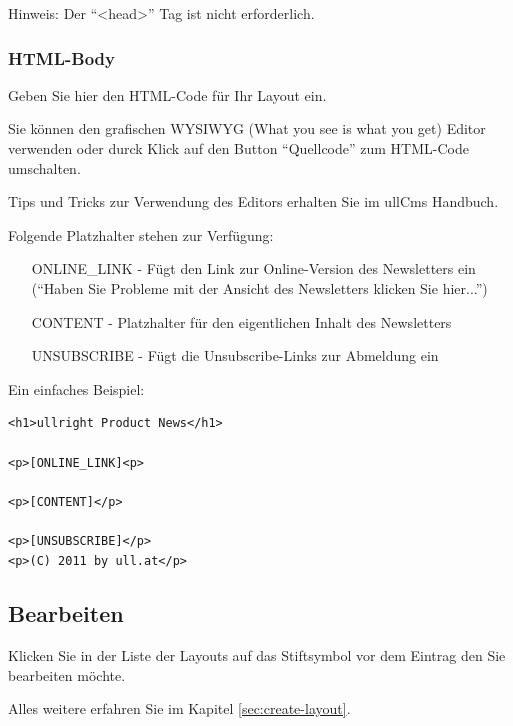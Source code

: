 \documentclass[article, a4paper, oneside, 11pt]{memoir}
\begin{document}
Hinweis: Der "`<head>"' Tag ist nicht erforderlich.

\subsubsection{HTML-Body}

Geben Sie hier den HTML-Code für Ihr Layout ein.

Sie können den grafischen WYSIWYG (What you see is what you get) Editor verwenden oder durck Klick auf den Button "`Quellcode"' zum HTML-Code umschalten.

Tips und Tricks zur Verwendung des Editors erhalten Sie im ullCms Handbuch.


Folgende Platzhalter stehen zur Verfügung:

\begin{itemize}
\item [ONLINE_LINK] - Fügt den Link zur Online-Version des Newsletters ein ("`Haben Sie Probleme mit der Ansicht des Newsletters klicken Sie hier..."')
\item [CONTENT] - Platzhalter für den eigentlichen Inhalt des Newsletters
\item [UNSUBSCRIBE] - Fügt die Unsubscribe-Links zur Abmeldung ein
\end{itemize}

Ein einfaches Beispiel:

\begin{lstlisting}
<h1>ullright Product News</h1>

<p>[ONLINE_LINK]<p>

<p>[CONTENT]</p>

<p>[UNSUBSCRIBE]</p>
<p>(C) 2011 by ull.at</p>
\end{lstlisting}

\subsection{Bearbeiten}

Klicken Sie in der Liste der Layouts auf das Stiftsymbol vor dem Eintrag den Sie bearbeiten möchte.

Alles weitere erfahren Sie im Kapitel \vref{sec:create-layout}.
\end{document}
